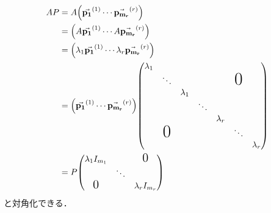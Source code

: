 \documentclass[autodetect-engine,dvipdfmx-if-dvi,ja=standard]{bxjsarticle}
\theoremstyle{mystyle1}
\theoremstyle{mystyle2}
\newcommand{\Largezero}{\ensuremath{\text{\Large{0}}}}
\begin{document}
\begin{align*}
  AP
                   & =A\qty(\va{p_1}^{\qty(1)}\cdots\va{p_{m_r}}^{\qty(r)})                                                                                        \\
                   & =\qty(A\va{p_1}^{\qty(1)}\cdots A\va{p_{m_r}}^{\qty(r)})                                                                                      \\
                   & =\qty(\lambda_1\va{p_1}^{\qty(1)}\cdots\lambda_r\va{p_{m_r}}^{\qty(r)})                                                                       \\
                   & =\qty(\va{p_1}^{\qty(1)}\cdots\va{p_{m_r}}^{\qty(r)})\mqty(
  \lambda_1        &                                                                         &                  &        &           &                 &           \\
                   & \ddots                                                                  &                  &        &           & \text{\huge{0}} &           \\
                   &                                                                         & \lambda_1        &        &           &                 &           \\
                   &                                                                         &                  & \ddots &           &                 &           \\
                   &                                                                         &                  &        & \lambda_r &                 &           \\
                   & \text{\huge{0}}                                                         &                  &        &           & \ddots          &           \\
                   &                                                                         &                  &        &           &                 & \lambda_r
  )                                                                                                                                                                \\
                   & =P\mqty(
  \lambda_1I_{m_1} &                                                                         & \Largezero                                                          \\
                   & \ddots                                                                  &                                                                     \\
  \Largezero       &                                                                         & \lambda_rI_{m_r}
  )
\end{align*}
と対角化できる．
\end{document}
